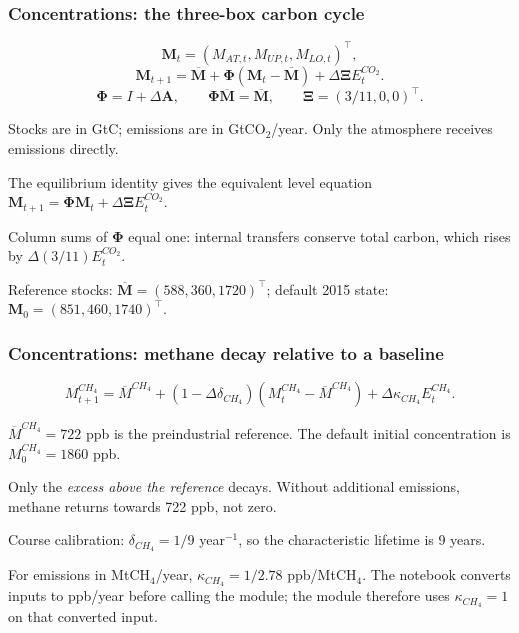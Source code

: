 \documentclass[xcolor=x11names,compress,aspectratio=169]{beamer}%
\makeatletter
\renewenvironment{itemize}{\begin{compactitemize}[<+-| alert@+>]}{\end{compactitemize}}
\makeatother
\begin{document}
\begin{frame}
\frametitle{Concentrations: the three-box carbon cycle}
\small
\[
\mathbf M_t=(M_{AT,t},M_{UP,t},M_{LO,t})^\top,
\]
\[
\mathbf M_{t+1}=\overline{\mathbf M}
+\boldsymbol\Phi(\mathbf M_t-\overline{\mathbf M})
+\Delta\boldsymbol\Xi E^{CO_2}_t.
\]
\[
\boldsymbol\Phi=I+\Delta\mathbf A,\qquad
\boldsymbol\Phi\overline{\mathbf M}=\overline{\mathbf M},\qquad
\boldsymbol\Xi=(3/11,0,0)^\top.
\]
\begin{itemize}
\item Stocks are in GtC; emissions are in GtCO$_2$/year.
Only the atmosphere receives emissions directly.
\item The equilibrium identity gives the equivalent level equation
$\mathbf M_{t+1}=\boldsymbol\Phi\mathbf M_t+\Delta\boldsymbol\Xi E^{CO_2}_t$.
\item Column sums of $\boldsymbol\Phi$ equal one: internal transfers
conserve total carbon, which rises by $\Delta(3/11)E^{CO_2}_t$.
\item Reference stocks: $\overline{\mathbf M}=(588,360,1720)^\top$;
default 2015 state: $\mathbf M_0=(851,460,1740)^\top$.
\end{itemize}
\transboxout
\end{frame}
%

\begin{frame}
\frametitle{Concentrations: methane decay relative to a baseline}
\small
\[
\boxed{M^{CH_4}_{t+1}=\overline M^{CH_4}
+(1-\Delta\delta_{CH_4})(M^{CH_4}_t-\overline M^{CH_4})
+\Delta\kappa_{CH_4}E^{CH_4}_t.}
\]
\begin{itemize}
\item $\overline M^{CH_4}=722$ ppb is the preindustrial reference.
The default initial concentration is $M^{CH_4}_0=1860$ ppb.
\item Only the \emph{excess above the reference} decays. Without additional
emissions, methane returns towards 722 ppb, not zero.
\item Course calibration: $\delta_{CH_4}=1/9$ year$^{-1}$,
so the characteristic lifetime is 9 years.
\item For emissions in MtCH$_4$/year, $\kappa_{CH_4}=1/2.78$ ppb/MtCH$_4$.
The notebook converts inputs to ppb/year before calling the module;
the module therefore uses $\kappa_{CH_4}=1$ on that converted input.
\end{itemize}
\transboxout
\end{frame}
\end{document}
